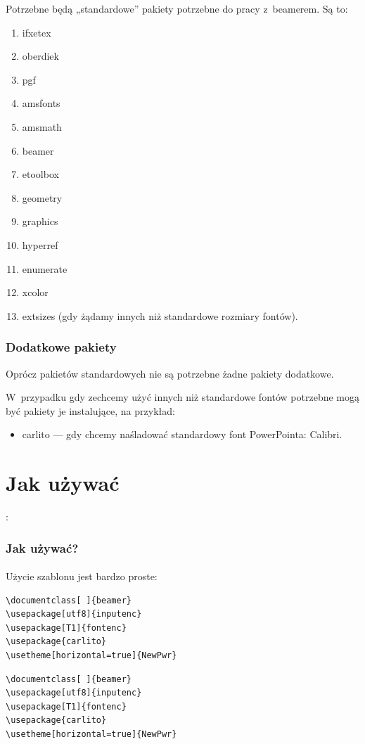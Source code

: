 Potrzebne będą „standardowe” pakiety potrzebne do pracy z~beamerem. Są to:
\begin{enumerate}
 \item
       ifxetex
 \item
       oberdiek
 \item
       pgf
 \item
       amsfonts
 \item
       amsmath
 \item
       beamer
 \item
       etoolbox
 \item
       geometry
 \item
       graphics
 \item
       hyperref
 \item
       enumerate
 \item
       xcolor
 \item
       extsizes (gdy żądamy innych niż standardowe rozmiary fontów).
\end{enumerate}
\begin{frame}
 \frametitle{Dodatkowe pakiety}

 Oprócz pakietów standardowych  nie są potrzebne żadne pakiety dodatkowe.

 W~przypadku gdy zechcemy użyć innych niż standardowe fontów potrzebne mogą być pakiety je instalujące, na przykład:
 \begin{itemize}
  \item
        carlito — gdy chcemy naśladować standardowy font PowerPointa: Calibri.
 \end{itemize}
\end{frame}

\section{Jak używać}

:

\begin{frame}[fragile]
 \frametitle<presentation>{Jak używać?}
 \framesubtitle{}
 Użycie szablonu jest bardzo proste:
 \ifpdf
  \begin{lstlisting}  
\documentclass[ ]{beamer}
\usepackage[utf8]{inputenc}
\usepackage[T1]{fontenc}
\usepackage{carlito}
\usetheme[horizontal=true]{NewPwr}
\end{lstlisting}
 \else
  \begin{verbatim}  
\documentclass[ ]{beamer}
\usepackage[utf8]{inputenc}
\usepackage[T1]{fontenc}
\usepackage{carlito}
\usetheme[horizontal=true]{NewPwr}
\end{verbatim}
 \fi
\end{frame}

